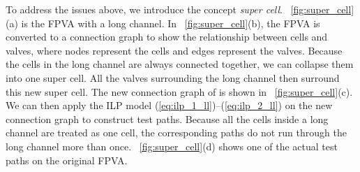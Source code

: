 \documentclass[journal,twoside]{IEEEtran}
\begin{document}
To address the issues above, we introduce the concept \textit{super cell}.
\figname~\ref{fig:super_cell}(a) is the FPVA with a long channel. In
\figname~\ref{fig:super_cell}(b), the FPVA is converted to a connection graph
to show the relationship between cells and valves, where nodes represent the
cells and edges represent the valves. Because the cells in
the long channel are always connected together, we can collapse them into one
super cell. All the valves surrounding the long channel then surround this new
super cell. The new connection graph of is shown in
\figname~\ref{fig:super_cell}(c). We can then apply the ILP model
(\ref{eq:ilp_1_ll})--(\ref{eq:ilp_2_ll}) 
on the new connection graph to construct test paths.  Because all the cells
inside a long channel are treated as one cell, the corresponding paths do not run
through the long channel more than once. \figname~\ref{fig:super_cell}(d)
shows one of the actual test paths on the original FPVA. 
\end{document}
